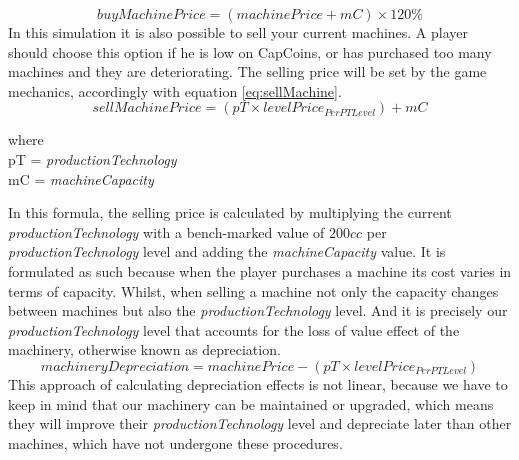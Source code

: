 \begin{equation}
buyMachinePrice=(machinePrice+mC)\times 120\%
\label{eq:buyMachine}
\end{equation}
In this simulation it is also possible to sell your current machines. A player should choose this option if he is low on CapCoins, or has purchased too many machines and they are deteriorating. The selling price will be set by the game mechanics, accordingly with equation \ref{eq:sellMachine}.
\begin{equation}
sellMachinePrice=(pT \times levelPrice_{PerPTLevel})+mC
\label{eq:sellMachine}
\end{equation}
\begin{center}
	where\\
	pT = \textit{productionTechnology} \\
	mC = \textit{machineCapacity}
\end{center}
In this formula, the selling price is calculated by multiplying the current \textit{productionTechnology} with a bench-marked value of $200cc$ per \textit{productionTechnology} level and adding the \textit{machineCapacity} value. It is formulated as such because when the player purchases a machine its cost varies in terms of capacity. Whilst, when selling a machine not only the capacity changes between machines but also the \textit{productionTechnology} level. And it is precisely our \textit{productionTechnology} level that accounts for the loss of value effect of the machinery, otherwise known as depreciation. 
\begin{equation}
machineryDepreciation= machinePrice - (pT \times levelPrice_{PerPTLevel})
    \label{eq:machineDepreciation}
\end{equation}
This approach of calculating depreciation effects is not linear, because we have to keep in mind that our machinery can be maintained or upgraded, which means they will improve their \textit{productionTechnology} level and depreciate later than other machines, which have not undergone these procedures.

